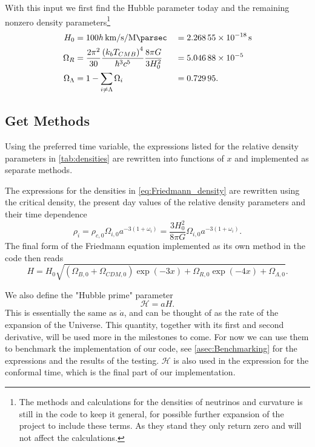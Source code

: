\documentclass[10pt,a4paper]{article}
\begin{document}
With this input we first find the Hubble parameter today and the remaining nonzero density parameters\footnote{The methods and calculations for the densities of neutrinos and curvature is still in the code to keep it general, for possible further expansion of the project to include these terms. As they stand they only return zero and will not affect the calculations.}
%
\begin{alignat}{2}
    H_0 &= 100h\,\si{\km\per\s\per\mega\parsec} &&= \SI{2.26855e-18}{s}\label{eq:H0}
    \\
    \Omega_R &= \frac{2\pi^2}{30}\frac{\left(k_bT_{CMB}\right)^4}{\hbar^3c^5}\frac{8\pi G}{3H_0^2} &&= \num{5.04688e-5} \label{eq:OmegaR0}
    \\
    \Omega_\Lambda &= 1 - \sum_{i\neq \Lambda} \Omega_i &&= \num{0.72995} \label{eq:OmegaLambda0}.
\end{alignat}
%
\subsection{Get Methods}
\label{subsec:Method/Get methods}
Using the preferred time variable, the expressions listed for the relative density parameters in \cref{tab:densities} are rewritten into functions of $x$ and implemented as separate methods.

The expressions for the densities in \cref{eq:Friedmann_density} are rewritten using the critical density, the present day values of the relative density parameters and their time dependence 
%
\begin{equation}
    \rho_i = \rho_{c,0} \Omega_{i,0} a^{-3(1+\omega_i)} = \frac{3H_0^2}{8\pi G}\Omega_{i,0} a^{-3(1+\omega_i)}.
\end{equation}
%
The final form of the Friedmann equation implemented as its own method in the code then reads
%
\begin{equation}
    H = H_0 \sqrt{\left(\Omega_{B,0}+\Omega_{CDM,0}\right)\exp(-3x) + \Omega_{R,0}\exp(-4x) + \Omega_{\Lambda,0}}.
    \label{eq:Friedmann implemented} 
\end{equation}

We also define the "Hubble prime" parameter
%
\begin{equation}
    \mathcal{H} = aH.
    \label{eq:Hprime}
\end{equation}
This is essentially the same as $\dot{a}$, and can be thought of as the rate of the expansion of the Universe. This quantity, together with its first and second derivative, will be used more in the milestones to come. For now we can use them to benchmark the implementation of our code, see \cref{asec:Benchmarking} for the expressions and the results of the testing. $\mathcal{H}$ is also used in the expression for the conformal time, which is the final part of our implementation.
\end{document}
